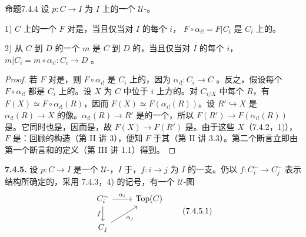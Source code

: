 \begin{SGAresult}{命题}{7.4.4}
设 $p:C\to I$ 为 $I$ 上的一个 $\mathcal U$-。

1) $C$ 上的一个 $F$ 对是，当且仅当对 $I$ 的每个 $i$， $F\circ\alpha_{i!}=F|C_i$ 是 $C_i$ 上的。

2) 从 $C$ 到 $D$ 的一个 $m$ 是 $C$ 到 $D$ 的，当且仅当对 $I$ 的每个 $i$，$m|C_i=m\circ\alpha_{i!}:C_i\to D$ 。
\end{SGAresult}
\begin{proof}
若 $F$ 对是，则 $F\circ\alpha_{i!}$ 是 $C_i$ 上的，因为 $\alpha_{i!}:C_i\to C$ 。反之，假设每个 $F\circ\alpha_{i!}$ 都是 $C_i$ 上的。设 $X$ 为 $C$ 中位于 $i$ 上方的。对 $C_{i/X}$ 中每个 $R$，有 $F(X)\simeq F\circ\alpha_{i!}(R)$，因而 $F(X)\simeq F(\alpha_{i!}(R))$。设 $R'\hookrightarrow X$ 是 $\alpha_{i!}(R)\to X$ 的像。$\alpha_{i!}(R)\to R'$ 是的一个，所以 $F(R')\to F(\alpha_{i!}(R))$ 是。它同时也是，因而是，故 $F(X)\to F(R')$ 是。由于这些 $X$（7.4.2，1)）， $F$ 是：回顾的构造（第 II 讲 3），便知 $F$ 于其（第 II 讲 3.3）。第二个断言立即由第一个断言和的定义（第 III 讲 1.1）得到。
\end{proof}
\textbf{7.4.5.} 设 $p:C\to I$ 是一个 $\mathcal U$-，$I$ 于，$f:i\to j$ 为 $I$ 的一支。仍以 $f:C_i^\sim\to C_j^\sim$ 表示结构所确定的，采用 7.4.3，4) 的记号，有一个 $\mathcal U$-图
\[\begin{tikzcd}
C_i^\sim\arrow[r,"\alpha_i"]\arrow[d,"f"']&\operatorname{Top}(C)\\
C_j\arrow[ur,"\alpha_j"']&
\end{tikzcd}\tag{7.4.5.1}\]
